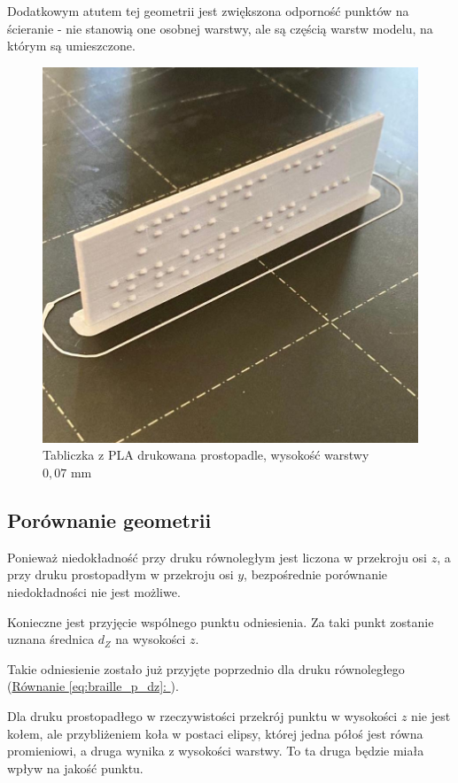\documentclass[12pt,a4paper]{article}
\newcommand*{\feqref}[1]{(\hyperref[{#1}]{Równanie \ref{#1}: \nameref*{#1}})}
\begin{document}
Dodatkowym atutem tej geometrii jest zwiększona odporność punktów na ścieranie - nie stanowią one osobnej warstwy, ale są częścią warstw modelu, na którym są umieszczone.

\begin{figure}
\includegraphics[width=\linewidth]{sgn_printed.jpg}
\caption{Tabliczka z PLA drukowana prostopadle, wysokość warstwy $0{,}07 \text{ mm}$}
\end{figure}

\subsection{Porównanie geometrii}
Ponieważ niedokładność przy druku równoległym jest liczona w przekroju osi $z$, a przy druku prostopadłym w przekroju osi $y$, bezpośrednie porównanie niedokładności nie jest możliwe.

Konieczne jest przyjęcie wspólnego punktu odniesienia. Za taki punkt zostanie uznana średnica $d_Z$ na wysokości $z$.

Takie odniesienie zostało już przyjęte poprzednio dla druku równoległego \feqref{eq:braille_p_dz}.

Dla druku prostopadłego w rzeczywistości przekrój punktu w wysokości $z$ nie jest kołem, ale przybliżeniem koła w postaci elipsy, której jedna półoś jest równa promieniowi, a druga wynika z wysokości warstwy. To ta druga będzie miała wpływ na jakość punktu.
\end{document}
